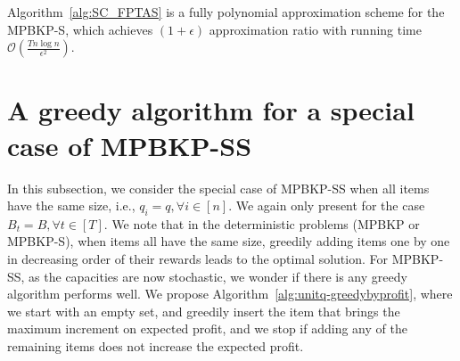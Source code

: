 \documentclass[11pt]{article}
\begin{document}
\begin{theorem}\label{main:MPBKP-S}
Algorithm~\ref{alg:SC_FPTAS} is a fully polynomial approximation scheme for the MPBKP-S, which achieves $(1+\epsilon)$ approximation ratio with running time $\mathcal{O}\left(\frac{Tn\log n}{\epsilon^2}\right)$.
\end{theorem}
\begin{comment}
\begin{remark}
Theorem~\ref{main:MPBKP-S}, together with Theorem~\ref{thm:FPTAS2}, implies that we can obtain a $(1-\epsilon)$ approximate solution for the MPBKP-S in $\mathcal{O}\left(\frac{n\log n}{\epsilon}\cdot\min\left\{\frac{T}{\epsilon},n\right\}\right)$, where Algorithm~\ref{alg:FPTAS2} is used when $T/\epsilon \gg n$ and Algorithm~\ref{alg:SC_FPTAS} is used when $T/\epsilon \ll n$.
\end{remark}


\begin{remark}
One may question if it is possible to achieve $\tilde{\Ocal}\left(n+T^\alpha/\epsilon^\beta\right)$ for some $\alpha,\beta$, as in the 0-1 Knapsack problem. We note that using a finer rounding technique as in~\cite{lawler1979fast}, the number of large items can be further bounded from $\Ocal(n)$ to $\Ocal\left(\frac{T}{\epsilon^2}\right)$, which would reduce the runtime of the DP (for large items) from $\Ocal\left(nT/\epsilon^2\right)$ to $\tilde{\Ocal}\left(n+T^2/\epsilon^4\right)$. However, the small items still have to be added one by one to the solutions of $\hat{A}_t(\bar{p})$, which in the worst case takes $\Ocal\left(\frac{nT}{\epsilon^2}\right)$. We cannot first group the small items into sets of partial solutions and do $(\max,+)$ convolution with solution sets of $\hat{A}_t(p)$, which would take $\Ocal\left(\frac{T^2}{\epsilon^4}\right)$ (similar to~\cite{ibarra1975fast,lawler1979fast}), because again the profits of two sets do not add up when we take the union of these two sets. Therefore, we do not further bound the number of large items as it does not improve the overall asymptotic time complexity (since the bottleneck is on packing small items).
\end{remark}
\end{comment}


\section{A greedy algorithm for a special case of MPBKP-SS}\label{sec:unit-MPBKP-SS}
In this subsection, we consider the special case of MPBKP-SS when all items have the same size, i.e., $q_i=q,\forall i\in[n]$. We again only present for the case $B_t = B,\forall t\in[T]$. We note that in the deterministic problems (MPBKP or MPBKP-S), when items all have the same size, greedily adding items one by one in decreasing order of their rewards leads to the optimal solution. For MPBKP-SS, as the capacities are now stochastic, we wonder if there is any greedy algorithm performs well. We propose Algorithm~\ref{alg:unitq-greedybyprofit}, where we start with an empty set, and greedily insert the item that brings the maximum increment on expected profit, and we stop if adding any of the remaining items does not increase the expected profit.
\end{document}
